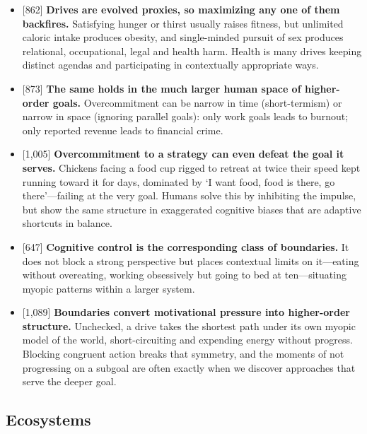 \documentclass[11pt]{article}
\newcommand{\ct}[1]{{\footnotesize\color{black!55}[#1]}\hspace{1pt}}
\begin{document}
\begin{itemize}
  \item \ct{862} \textbf{Drives are evolved proxies, so maximizing any one of them backfires.} Satisfying hunger or thirst usually raises fitness, but unlimited caloric intake produces obesity, and single-minded pursuit of sex produces relational, occupational, legal and health harm. Health is many drives keeping distinct agendas and participating in contextually appropriate ways.
  \item \ct{873} \textbf{The same holds in the much larger human space of higher-order goals.} Overcommitment can be narrow in time (short-termism) or narrow in space (ignoring parallel goals): only work goals leads to burnout; only reported revenue leads to financial crime.
  \item \ct{1,005} \textbf{Overcommitment to a strategy can even defeat the goal it serves.} Chickens facing a food cup rigged to retreat at twice their speed kept running toward it for days, dominated by `I want food, food is there, go there'---failing at the very goal. Humans solve this by inhibiting the impulse, but show the same structure in exaggerated cognitive biases that are adaptive shortcuts in balance.
  \item \ct{647} \textbf{Cognitive control is the corresponding class of boundaries.} It does not block a strong perspective but places contextual limits on it---eating without overeating, working obsessively but going to bed at ten---situating myopic patterns within a larger system.
  \item \ct{1,089} \textbf{Boundaries convert motivational pressure into higher-order structure.} Unchecked, a drive takes the shortest path under its own myopic model of the world, short-circuiting and expending energy without progress. Blocking congruent action breaks that symmetry, and the moments of not progressing on a subgoal are often exactly when we discover approaches that serve the deeper goal.
\end{itemize}

\subsection{Ecosystems}
\end{document}
